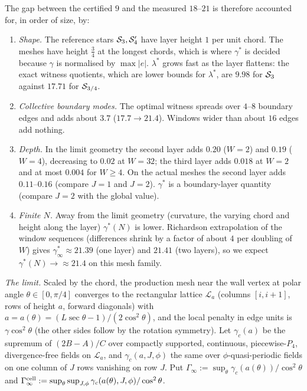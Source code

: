 The gap between the certified $9$ and the measured $18$--$21$ is therefore accounted for, in order of size, by:
\begin{enumerate}
\item \emph{Shape.} The reference stars $\mathcal S_3,\mathcal S_4'$ have layer height $1$ per unit chord. The meshes have height $\frac34$ at the
longest chords, which is where $\gamma^\ast$ is decided because $\gamma$ is normalised by $\max|e|$. $\lambda^\ast$ grows fast as the
layer flattens: the exact witness quotients, which are lower bounds for $\lambda^\ast$, are $9.98$ for $\mathcal S_3$ against $17.71$ for $\mathcal S_{3/4}$.
\item \emph{Collective boundary modes.} The optimal witness spreads over $4$--$8$ boundary edges and adds about $3.7$
($17.7\to21.4$). Windows wider than about $16$ edges add nothing.
\item \emph{Depth.} In the limit geometry the second layer adds $0.20$ ($W=2$) and $0.19$ ($W=4$), decreasing to $0.02$ at $W=32$; the third layer adds $0.018$ at $W=2$ and at most $0.004$ for $W\ge4$. On the actual meshes the second layer adds $0.11$--$0.16$ (compare $J=1$ and $J=2$). $\gamma^\ast$ is a boundary-layer quantity
(compare $J=2$ with the global value).
\item \emph{Finite $N$.} Away from the limit geometry (curvature, the varying chord and height along the layer) $\gamma^\ast(N)$ is
lower. Richardson extrapolation of the window sequences (differences shrink by a factor of about $4$ per doubling of $W$) gives
$\gamma^\ast_\infty\approx21.39$ (one layer) and $21.41$ (two layers), so we expect $\gamma^\ast(N)\to\approx21.4$ on this mesh family.
\end{enumerate}

\emph{The limit.} Scaled by the chord, the production mesh near the wall vertex at polar angle $\theta\in[0,\pi/4]$ converges to the rectangular lattice $\mathcal L_a$ (columns $[i,i+1]$, rows of height $a$, forward diagonals) with $a=a(\theta)=(L\sec\theta-1)/(2\cos^2\theta)$, and the local penalty in edge units is $\gamma\cos^2\theta$ (the other sides follow by the rotation symmetry). Let $\gamma_c(a)$ be the supremum of $(2B-A)/C$ over compactly supported, continuous, piecewise-$P_4$, divergence-free fields on $\mathcal L_a$, and $\gamma_c(a,J,\phi)$ the same over $\phi$-quasi-periodic fields on one column of $J$ rows vanishing on row $J$. Put $\Gamma_\infty:=\sup_\theta\gamma_c(a(\theta))/\cos^2\theta$ and $\Gamma^{\rm cell}_\infty:=\sup_\theta\sup_{J,\phi}\gamma_c(a(\theta),J,\phi)/\cos^2\theta$.

